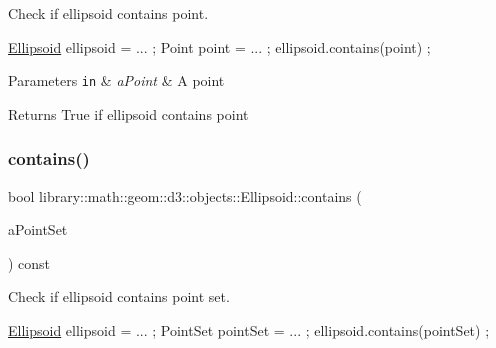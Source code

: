 Check if ellipsoid contains point. 


\begin{DoxyCode}
\hyperlink{classlibrary_1_1math_1_1geom_1_1d3_1_1objects_1_1_ellipsoid_aae81fe0edc7f0e8d4590ea89ae73cb14}{Ellipsoid} ellipsoid = ... ;
Point point = ... ;
ellipsoid.contains(point) ;
\end{DoxyCode}



\begin{DoxyParams}[1]{Parameters}
\mbox{\tt in}  & {\em a\+Point} & A point \\
\hline
\end{DoxyParams}
\begin{DoxyReturn}{Returns}
True if ellipsoid contains point 
\end{DoxyReturn}
\mbox{\label{classlibrary_1_1math_1_1geom_1_1d3_1_1objects_1_1_ellipsoid_af539fe9e2be122e3f994a48e7d308fd0}} 
\subsubsection{\texorpdfstring{contains()}{contains()}\hspace{0.1cm}{\footnotesize\ttfamily [2/3]}}
{\footnotesize\ttfamily bool library\+::math\+::geom\+::d3\+::objects\+::\+Ellipsoid\+::contains (\begin{DoxyParamCaption}\item[{const \hyperlink{classlibrary_1_1math_1_1geom_1_1d3_1_1objects_1_1_point_set}{Point\+Set} \&}]{a\+Point\+Set }\end{DoxyParamCaption}) const}



Check if ellipsoid contains point set. 


\begin{DoxyCode}
\hyperlink{classlibrary_1_1math_1_1geom_1_1d3_1_1objects_1_1_ellipsoid_aae81fe0edc7f0e8d4590ea89ae73cb14}{Ellipsoid} ellipsoid = ... ;
PointSet pointSet = ... ;
ellipsoid.contains(pointSet) ;
\end{DoxyCode}



